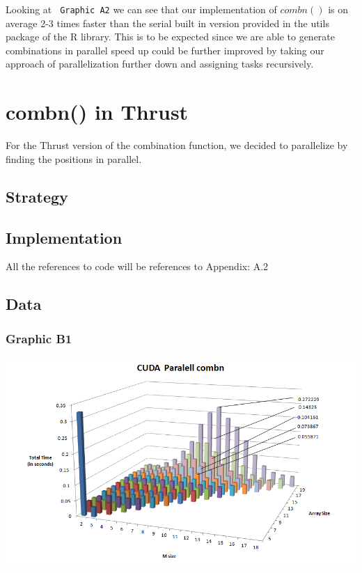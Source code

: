 \documentclass[titlepage, 11pt]{article}
\begin{document}
Looking at \verb; Graphic A2; we can see that our implementation of $combn()$ is on average 2-3 times faster than the serial built in version provided in the utils package of the R library. This is to be expected since we are able to generate combinations in parallel speed up could be further improved by taking our approach of parallelization further down and assigning tasks recursively.

\section{combn() in Thrust}
For the Thrust version of the combination function, we decided to parallelize by finding the positions in parallel.

\subsection{Strategy}

\subsection{Implementation}
\begin{center}\textcolor{black!50}{All the references to code will be references to Appendix: A.2}\\ \end{center}


\subsection{Data}
\subsubsection{Graphic B1}
\includegraphics[scale = 0.5]{3D-Thrust.png} \\
\end{document}
